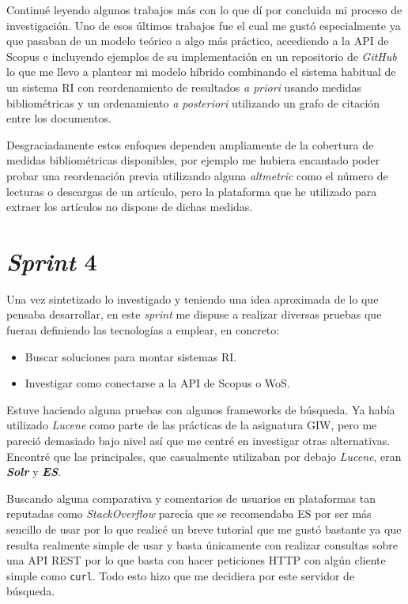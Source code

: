 Continué leyendo algunos trabajos más con lo que dí por concluida mi proceso de investigación. Uno de esos últimos trabajos fue \cite{DBLP:conf/ecir/SarolLS18} el cual me gustó especialmente ya que pasaban de un modelo teórico a algo más práctico, accediendo a la \acrshort{API} de Scopus e incluyendo ejemplos de su implementación en un repositorio de \textit{GitHub} lo que me llevo a plantear mi modelo híbrido combinando el sistema habitual de un sistema \acrshort{RI} con reordenamiento de resultados \textit{a priori} usando medidas bibliométricas y un ordenamiento \textit{a posteriori} utilizando un grafo de citación entre los documentos.

Desgraciadamente estos enfoques dependen ampliamente de la cobertura de medidas bibliométricas disponibles, por ejemplo me hubiera encantado poder probar una reordenación previa utilizando alguna \textit{altmetric} como el número de lecturas o descargas de un artículo, pero la plataforma que he utilizado para extraer los artículos no dispone de dichas medidas.

\section{\textit{Sprint} 4}
\label{sc:sprint4}
Una vez sintetizado lo investigado y teniendo una idea aproximada de lo que pensaba desarrollar, en este \textit{sprint} me dispuse a realizar diversas pruebas que fueran definiendo las tecnologías a emplear, en concreto:
\begin{itemize}
	\item Buscar soluciones para montar sistemas \acrshort{RI}.
	\item Investigar como conectarse a la \acrshort{API} de Scopus o \acrshort{WoS}.
\end{itemize}

Estuve haciendo alguna pruebas con algunos \glspl{framework} de búsqueda. Ya había utilizado \textit{Lucene} como parte de las prácticas de la asignatura \acrshort{GIW}, pero me pareció demasiado bajo nivel así que me centré en investigar otras alternativas. Encontré que las principales, que casualmente utilizaban por debajo \textit{Lucene}, eran \textit{\textbf{Solr}} y \textit{\textbf{\acrfull{ES}}}.

Buscando alguna comparativa \cite{ES_Solr} y comentarios de usuarios en plataformas tan reputadas como \textit{StackOverflow} \cite{ES_Solr_SO} parecía que se recomendaba \acrshort{ES} por ser más sencillo de usar por lo que realicé un breve tutorial \cite{ES_tutorial} que me gustó bastante ya que resulta realmente simple de usar y basta únicamente con realizar consultas sobre una \acrshort{API} \acrshort{REST} por lo que basta con hacer peticiones \acrshort{HTTP} con algún cliente simple como \texttt{curl}. Todo esto hizo que me decidiera por este servidor de búsqueda.

